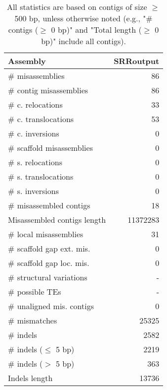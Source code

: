 \documentclass[12pt,a4paper]{article}
\begin{document}
\begin{table}[ht]
\begin{center}
\caption{All statistics are based on contigs of size $\geq$ 500 bp, unless otherwise noted (e.g., "\# contigs ($\geq$ 0 bp)" and "Total length ($\geq$ 0 bp)" include all contigs).}
\begin{tabular}{|l*{1}{|r}|}
\hline
Assembly & SRRoutput \\ \hline
\# misassemblies & 86 \\ \hline
\hspace{2mm}\# contig misassemblies & 86 \\ \hline
\hspace{5mm}\# c. relocations & 33 \\ \hline
\hspace{5mm}\# c. translocations & 53 \\ \hline
\hspace{5mm}\# c. inversions & 0 \\ \hline
\hspace{2mm}\# scaffold misassemblies & 0 \\ \hline
\hspace{5mm}\# s. relocations & 0 \\ \hline
\hspace{5mm}\# s. translocations & 0 \\ \hline
\hspace{5mm}\# s. inversions & 0 \\ \hline
\# misassembled contigs & 18 \\ \hline
Misassembled contigs length & 11372283 \\ \hline
\# local misassemblies & 31 \\ \hline
\# scaffold gap ext. mis. & 0 \\ \hline
\# scaffold gap loc. mis. & 0 \\ \hline
\# structural variations & - \\ \hline
\# possible TEs & - \\ \hline
\# unaligned mis. contigs & 0 \\ \hline
\# mismatches & 25325 \\ \hline
\# indels & 2582 \\ \hline
\hspace{5mm}\# indels ($\leq$ 5 bp) & 2219 \\ \hline
\hspace{5mm}\# indels ($>$ 5 bp) & 363 \\ \hline
Indels length & 13736 \\ \hline
\end{tabular}
\end{center}
\end{table}
\end{document}
